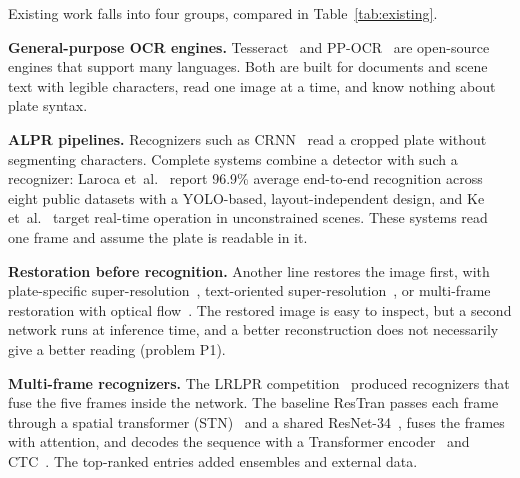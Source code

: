 \documentclass[11pt,a4paper]{article}
\begin{document}
Existing work falls into four groups, compared in Table~\ref{tab:existing}.

\textbf{General-purpose OCR engines.} Tesseract~\cite{smith2007tesseract} and PP-OCR~\cite{du2020ppocr} are open-source engines that support many languages. Both are built for documents and scene text with legible characters, read one image at a time, and know nothing about plate syntax.

\textbf{ALPR pipelines.} Recognizers such as CRNN~\cite{shi2017crnn} read a cropped plate without segmenting characters. Complete systems combine a detector with such a recognizer: Laroca et~al.~\cite{laroca2021efficient} report 96.9\% average end-to-end recognition across eight public datasets with a YOLO-based, layout-independent design, and Ke et~al.~\cite{ke2023ultrafast} target real-time operation in unconstrained scenes. These systems read one frame and assume the plate is readable in it.

\textbf{Restoration before recognition.} Another line restores the image first, with plate-specific super-resolution~\cite{nascimento2023sr,nascimento2025benchmark}, text-oriented super-resolution~\cite{wang2020tsrn}, or multi-frame restoration with optical flow~\cite{na2025mflpr2}. The restored image is easy to inspect, but a second network runs at inference time, and a better reconstruction does not necessarily give a better reading (problem P1).

\textbf{Multi-frame recognizers.} The LRLPR competition~\cite{laroca2026icpr} produced recognizers that fuse the five frames inside the network. The baseline ResTran passes each frame through a spatial transformer (STN)~\cite{jaderberg2015stn} and a shared ResNet-34~\cite{he2016resnet}, fuses the frames with attention, and decodes the sequence with a Transformer encoder~\cite{vaswani2017attention} and CTC~\cite{graves2006ctc}. The top-ranked entries added ensembles and external data.
\end{document}
